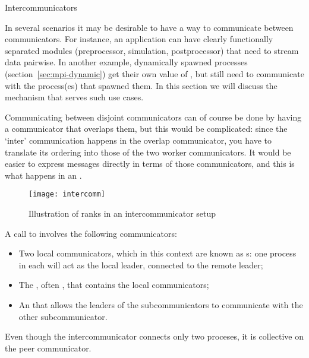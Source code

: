 
 {Intercommunicators}
\label{sec:mpi-intercomm}

In several scenarios it may be desirable to have a way to communicate
between communicators. For instance, an application can have clearly
functionally separated modules (preprocessor, simulation,
postprocessor) that need to stream data pairwise. In another example,
dynamically spawned processes (section~\ref{sec:mpi-dynamic}) get
their own value of , but still need to
communicate with the process(es) that spawned them. In this section we
will discuss the  mechanism that
serves such use cases.

Communicating between disjoint communicators can of course be done by
having a
communicator that overlaps them, but this would be complicated: since
the `inter' communication happens in the overlap communicator, you
have to translate its ordering into those of the two worker
communicators. It would be easier to express messages directly in
terms of those communicators, and this is what happens in an
.

\begin{figure}[ht]
  \texttt{[image: intercomm]}
  \caption{Illustration of ranks in an intercommunicator setup}
  \label{fig:intercomm}
\end{figure}

A call to
involves the following communicators:
\begin{itemize}
\item Two local communicators, which in this context are known as
  s: one process in each will act as
  the local leader, connected to the remote leader;
\item The , often
  , that contains the local
  communicators;
\item An  that allows the leaders
  of the subcommunicators to communicate with the other subcommunicator.
\end{itemize}
Even though the intercommunicator connects only two proceses, it is
collective on the peer communicator.

